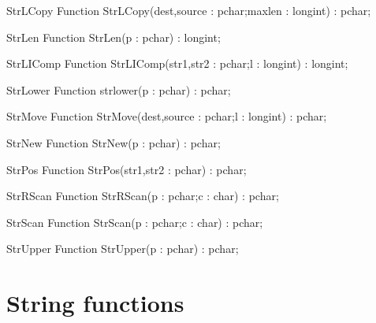  
\begin{function}{StrLCopy}
\Declaration
Function StrLCopy(dest,source : pchar;maxlen : longint) : pchar;
\Description
\Errors
\SeeAlso
\end{function}

 
\begin{function}{StrLen}
\Declaration
Function StrLen(p : pchar) : longint;
\Description
\Errors
\SeeAlso
\end{function}

 
\begin{function}{StrLIComp}
\Declaration
Function StrLIComp(str1,str2 : pchar;l : longint) : longint;
\Description
\Errors
\SeeAlso
\end{function}

 
\begin{function}{StrLower}
\Declaration
Function strlower(p : pchar) : pchar;
\Description
\Errors
\SeeAlso
\end{function}

 
\begin{function}{StrMove}
\Declaration
Function StrMove(dest,source : pchar;l : longint) : pchar;
\Description
\Errors
\SeeAlso
\end{function}

 
\begin{function}{StrNew}
\Declaration
Function StrNew(p : pchar) : pchar;
\Description
\Errors
\SeeAlso
\end{function}

 
\begin{function}{StrPos}
\Declaration
Function StrPos(str1,str2 : pchar) : pchar;
\Description
\Errors
\SeeAlso
\end{function}

 
\begin{function}{StrRScan}
\Declaration
Function StrRScan(p : pchar;c : char) : pchar;
\Description
\Errors
\SeeAlso
\end{function}

 
\begin{function}{StrScan}
\Declaration
Function StrScan(p : pchar;c : char) : pchar;
\Description
\Errors
\SeeAlso
\end{function}

 
\begin{function}{StrUpper}
\Declaration
Function StrUpper(p : pchar) : pchar;
\Description
\Errors
\SeeAlso
\end{function}

\section{String functions}

